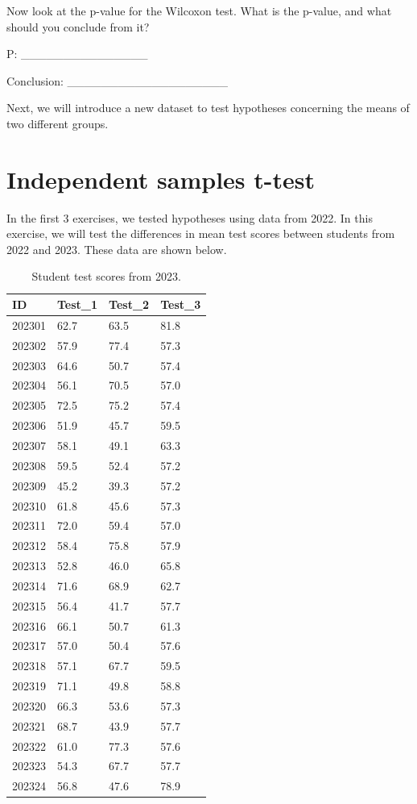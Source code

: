 \documentclass[
]{scrbook}
\begin{document}
Now look at the p-value for the Wilcoxon test.
What is the p-value, and what should you conclude from it?

P: \_\_\_\_\_\_\_\_\_\_\_\_\_\_\_

Conclusion: \_\_\_\_\_\_\_\_\_\_\_\_\_\_\_\_\_\_\_

Next, we will introduce a new dataset to test hypotheses concerning the means of two different groups.

\hypertarget{independent-samples-t-test-1}{%
\section{Independent samples t-test}\label{independent-samples-t-test-1}}

In the first 3 exercises, we tested hypotheses using data from 2022.
In this exercise, we will test the differences in mean test scores between students from 2022 and 2023.
These data are shown below.

\begin{table}

\caption{\label{tab:unnamed-chunk-103}Student test scores from 2023.}
\centering
\begin{tabular}[t]{l|l|l|l}
\hline
ID & Test\_1 & Test\_2 & Test\_3\\
\hline
202301 & 62.7 & 63.5 & 81.8\\
\hline
202302 & 57.9 & 77.4 & 57.3\\
\hline
202303 & 64.6 & 50.7 & 57.4\\
\hline
202304 & 56.1 & 70.5 & 57.0\\
\hline
202305 & 72.5 & 75.2 & 57.4\\
\hline
202306 & 51.9 & 45.7 & 59.5\\
\hline
202307 & 58.1 & 49.1 & 63.3\\
\hline
202308 & 59.5 & 52.4 & 57.2\\
\hline
202309 & 45.2 & 39.3 & 57.2\\
\hline
202310 & 61.8 & 45.6 & 57.3\\
\hline
202311 & 72.0 & 59.4 & 57.0\\
\hline
202312 & 58.4 & 75.8 & 57.9\\
\hline
202313 & 52.8 & 46.0 & 65.8\\
\hline
202314 & 71.6 & 68.9 & 62.7\\
\hline
202315 & 56.4 & 41.7 & 57.7\\
\hline
202316 & 66.1 & 50.7 & 61.3\\
\hline
202317 & 57.0 & 50.4 & 57.6\\
\hline
202318 & 57.1 & 67.7 & 59.5\\
\hline
202319 & 71.1 & 49.8 & 58.8\\
\hline
202320 & 66.3 & 53.6 & 57.3\\
\hline
202321 & 68.7 & 43.9 & 57.7\\
\hline
202322 & 61.0 & 77.3 & 57.6\\
\hline
202323 & 54.3 & 67.7 & 57.7\\
\hline
202324 & 56.8 & 47.6 & 78.9\\
\hline
\end{tabular}
\end{table}
\end{document}
